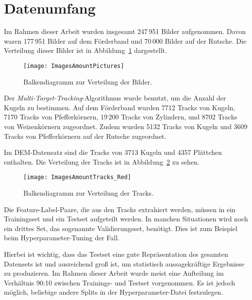 \section{Datenumfang}

Im Rahmen dieser Arbeit wurden insgesamt 247\,951 Bilder aufgenommen.
Davon waren 177\,951 Bilder auf dem Förderband und 70\,000 Bilder auf der Rutsche.
Die Verteilung dieser Bilder ist in Abbildung~\ref{fig:barPics} dargestellt.

\begin{figure}[p]
	\centering
	\texttt{[image: ImagesAmountPictures]}
	\caption{Balkendiagramm zur Verteilung der Bilder.}
	\label{fig:barPics}
\end{figure}

Der \textit{Multi-Target-Tracking}-Algorithmus wurde benutzt, um die Anzahl der Kugeln zu bestimmen.
Auf dem Förderband wurden 7712 Tracks von Kugeln,
7170 Tracks von Pfefferkörnern,
19\,200 Tracks von Zylindern,
und 8702 Tracks von Weizenkörnern zugeordnet.
Zudem wurden 5132 Tracks von Kugeln und 3609 Tracks von Pfefferkörnern auf der Rutsche zugeordnet.

Im DEM-Datensatz sind die Tracks von 3713 Kugeln und 4357 Plättchen enthalten.
Die Verteilung der Tracks ist in Abbildung~\ref{fig:barTracks} zu sehen.

\begin{figure}[p]
	\centering
	\texttt{[image: ImagesAmountTracks\_Red]}
	\caption{Balkendiagramm zur Verteilung der Tracks.}
	\label{fig:barTracks}
\end{figure}

Die Feature-Label-Paare, die aus den Tracks extrahiert werden, 
müssen in ein Trainingsset und ein Testset aufgeteilt werden.
In manchen Situationen wird noch ein drittes Set, das sogenannte Validierungsset, benötigt.
Dies ist zum Beispiel beim Hyperparameter-Tuning der Fall.

Hierbei ist wichtig, dass das Testset eine gute Repräsentation des gesamten Datensets ist 
und ausreichend groß ist, um statistisch aussagekräftige Ergebnisse zu produzieren.
Im Rahmen dieser Arbeit wurde meist eine Aufteilung im Verhältnis 90:10 zwischen Trainings- und Testset vorgenommen.
Es ist jedoch möglich, beliebige andere Splits in der Hyperparameter-Datei festzulegen.



